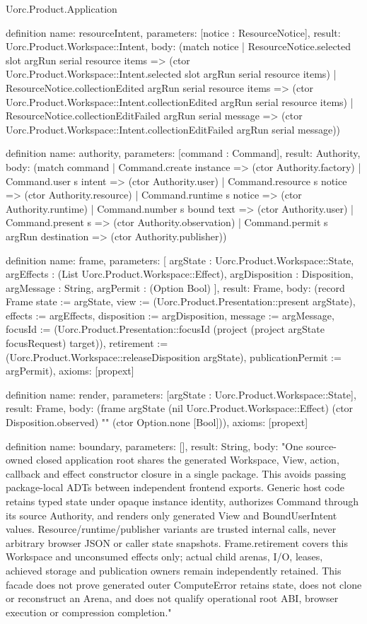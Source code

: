 \begin{lexlean}{Uorc.Product.Application}
\begin{semanticmodule}
definition{
  name: resourceIntent,
  parameters: [notice : ResourceNotice],
  result: Uorc.Product.Workspace::Intent,
  body: (match notice
    | ResourceNotice.selected slot argRun serial resource items => (ctor Uorc.Product.Workspace::Intent.selected slot argRun serial resource items)
    | ResourceNotice.collectionEdited argRun serial resource items => (ctor Uorc.Product.Workspace::Intent.collectionEdited argRun serial resource items)
    | ResourceNotice.collectionEditFailed argRun serial message => (ctor Uorc.Product.Workspace::Intent.collectionEditFailed argRun serial message))
}

definition{
  name: authority,
  parameters: [command : Command],
  result: Authority,
  body: (match command
    | Command.create instance => (ctor Authority.factory)
    | Command.user s intent => (ctor Authority.user)
    | Command.resource s notice => (ctor Authority.resource)
    | Command.runtime s notice => (ctor Authority.runtime)
    | Command.number s bound text => (ctor Authority.user)
    | Command.present s => (ctor Authority.observation)
    | Command.permit s argRun destination => (ctor Authority.publisher))
}

definition{
  name: frame,
  parameters: [
    argState : Uorc.Product.Workspace::State,
    argEffects : (List Uorc.Product.Workspace::Effect),
    argDisposition : Disposition,
    argMessage : String,
    argPermit : (Option Bool)
  ],
  result: Frame,
  body: (record Frame {state := argState, view := (Uorc.Product.Presentation::present argState), effects := argEffects, disposition := argDisposition, message := argMessage, focusId := (Uorc.Product.Presentation::focusId (project (project argState focusRequest) target)), retirement := (Uorc.Product.Workspace::releaseDisposition argState), publicationPermit := argPermit}),
  axioms: [propext]
}

definition{
  name: render,
  parameters: [argState : Uorc.Product.Workspace::State],
  result: Frame,
  body: (frame argState (nil Uorc.Product.Workspace::Effect) (ctor Disposition.observed) "" (ctor Option.none [Bool])),
  axioms: [propext]
}

definition{
  name: boundary,
  parameters: [],
  result: String,
  body: "One source-owned closed application root shares the generated Workspace, View, action, callback and effect constructor closure in a single package. This avoids passing package-local ADTs between independent frontend exports. Generic host code retains typed state under opaque instance identity, authorizes Command through its source Authority, and renders only generated View and BoundUserIntent values. Resource/runtime/publisher variants are trusted internal calls, never arbitrary browser JSON or caller state snapshots. Frame.retirement covers this Workspace and unconsumed effects only; actual child arenas, I/O, leases, achieved storage and publication owners remain independently retained. This facade does not prove generated outer ComputeError retains state, does not clone or reconstruct an Arena, and does not qualify operational root ABI, browser execution or compression completion."
}


\end{semanticmodule}
\end{lexlean}
